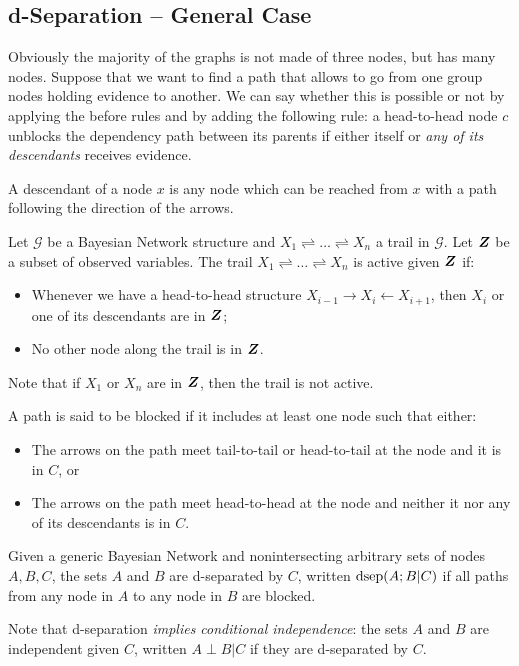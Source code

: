 \subsection{d-Separation -- General Case}
Obviously the majority of the graphs is not made of three nodes, but has many nodes. Suppose that we want to find a path that allows to go from one group nodes holding evidence to another. We can say whether this is possible or not by applying the before rules and by adding the following rule: a head-to-head node $c$ unblocks the dependency path between its parents if either itself or \textit{any of its descendants} receives evidence. \newline
\begin{definition}[Descendant]
  A descendant of a node $x$ is any node which can be reached from $x$ with a path following the direction of the arrows.   
\end{definition}
\begin{theorem}
  Let $\mathcal{G}$ be a Bayesian Network structure and $X_1\rightleftharpoons\hdots\rightleftharpoons X_n$ a trail in $\mathcal{G}$. Let $\bm{Z}$ be a subset of observed variables. The trail $X_1\rightleftharpoons\hdots\rightleftharpoons X_n$ is active given $\bm{Z}$ if:
  \begin{itemize}
    \item Whenever we have a head-to-head structure $X_{i-1}\rightarrow X_i\leftarrow X_{i+1}$, then $X_i$ or one of its descendants are in $\bm{Z}$;
    \item No other node along the trail is in $\bm{Z}$.
  \end{itemize}
\end{theorem}
Note that if $X_1$ or $X_n$ are in $\bm{Z}$, then the trail is not active. \newline
\begin{definition}
  A path is said to be blocked if it includes at least one node such that either:
  \begin{itemize}
    \item The arrows on the path meet tail-to-tail or head-to-tail at the node and it is in $C$, or
    \item The arrows on the path meet head-to-head at the node and neither it nor any of its descendants is in $C$. 
  \end{itemize}
\end{definition}
\begin{definition}
  Given a generic Bayesian Network and nonintersecting arbitrary sets of nodes $A,B,C$, the sets $A$ and $B$ are d-separated by $C$, written $\text{dsep}(A;B\vert C)$ if all paths from any node in $A$ to any node in $B$ are blocked.
  \label{def:dSeparation}
\end{definition}
Note that d-separation \textit{implies conditional independence}: the sets $A$ and $B$ are independent given $C$, written $A\perp B\vert C$ if they are d-separated by $C$.
%
